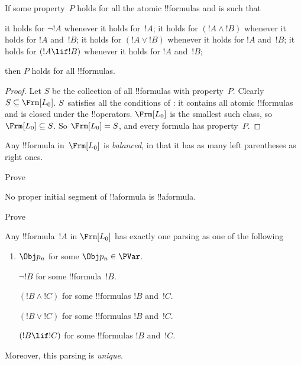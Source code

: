 

\begin{thm}
  If some property~$P$ holds for all the atomic !!{formula}s and is
  such that
  \begin{enumerate}
    it holds for $\lnot !A$ whenever it holds
      for~$!A$;
    it holds for $(!A \land !B)$
      whenever it holds for $!A$ and~$!B$;
    it holds for $(!A \lor !B)$
      whenever it holds for $!A$ and~$!B$;
    it holds for $(!A \lif !B)$
      whenever it holds for $!A$ and~$!B$;
    
  \end{enumerate}
  then $P$ holds for all !!{formula}s.
\end{thm}

\begin{proof}
  Let $S$ be the collection of all !!{formula}s with
  property~$P$. Clearly $S \subseteq \Frm[L_0]$. $S$~satisfies all the
  conditions of : it contains all atomic
  !!{formula}s and is closed under the !!{operator}s.  $\Frm[L_0]$ is
  the smallest such class, so $\Frm[L_0] \subseteq S$. So $\Frm[L_0] = S$, and
  every formula has property~$P$.
\end{proof}

\begin{prop}
   Any !!{formula} in~$\Frm[L_0]$ is \emph{balanced}, in that it has
   as many left parentheses as right ones.
\end{prop}

\begin{prob}
Prove 
\end{prob}

\begin{prop} 
No proper initial segment of !!a{formula} is !!a{formula}.
\end{prop}

\begin{prob}
  Prove 
\end{prob}

\begin{prop}
Any !!{formula}~$!A$ in $ \Frm[L_0]$ has exactly one parsing as one of
the following
\begin{enumerate}
$\lfalse$.



\item $\Obj p_n$ for some $\Obj p_n \in  \PVar$.
  
$\lnot !B$ for some !!{formula}~$!B$.

$(!B \land !C)$ for some !!{formula}s $!B$ and~$!C$.

$(!B \lor !C)$ for some !!{formula}s $!B$ and~$!C$.

$(!B \lif !C)$ for some !!{formula}s $!B$ and~$!C$.


\end{enumerate}
Moreover, this parsing is \emph{unique}.
\end{prop}

